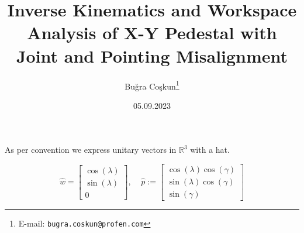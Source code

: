\documentclass[a4paper,onecolumn,11pt]{article}
\begin{document}
\title{Inverse Kinematics and Workspace Analysis of X-Y Pedestal
with Joint and Pointing Misalignment } 
\author{Buğra Coşkun\thanks{E-mail:
\texttt{bugra.coskun@profen.com}}}

\date{\vspace{-2ex}\scriptsize05.09.2023}
\maketitle
\vspace{-5ex}
\normalsize


As per convention we express unitary vectors in $\mathbb{R}^3$ with a hat.

\begin{equation}
    \hat w = \begin{bmatrix}
            \cos(\lambda) \\
            \sin(\lambda) \\
            0
        \end{bmatrix} , \;
    \;\;\;
    \hat p := \begin{bmatrix}
        \cos(\lambda) \cos(\gamma) \\
        \sin(\lambda) \cos(\gamma) \\
        \sin(\gamma)
    \end{bmatrix}
\end{equation}
\end{document}
